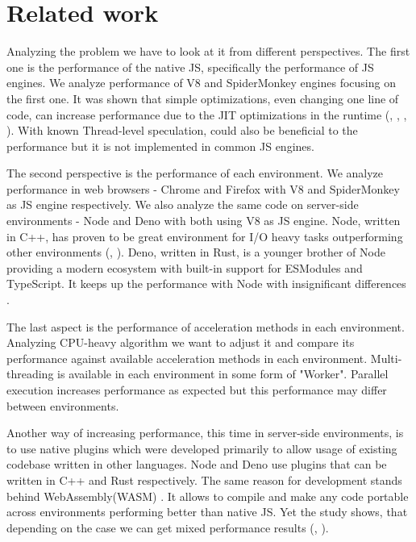 \section{Related work}
Analyzing the problem we have to look at it from different perspectives. The first one is the performance of the native JS, specifically the performance of JS engines. We analyze performance of V8 and SpiderMonkey engines focusing on the first one. It was shown that simple optimizations, even changing one line of code, can increase performance due to the JIT optimizations in the runtime (\cite{meurer_2017}, \cite{meurer_2019}, \cite{gong2015jitprof}, \cite{selakovic2016performance}). With known  Thread-level speculation, could also be beneficial to the performance \cite{martinsen2017combining} but it is not implemented in common JS engines.

The second perspective is the performance of each environment. We analyze performance in web browsers - Chrome and Firefox with V8 and SpiderMonkey \cite{spidermonkey} as JS engine respectively. We also analyze the same code on server-side environments - Node and Deno \cite{Deno} with both using V8 as JS engine. Node, written in C++, has proven to be great environment for I/O heavy tasks outperforming other environments (\cite{lei2014performance}, \cite{chitra2017performance}). Deno, written in Rust, is a younger brother of Node providing a modern ecosystem with built-in support for ESModules and TypeScript. It keeps up the performance with Node with insignificant differences \cite{choubey_2021}.

The last aspect is the performance of acceleration methods in each environment. Analyzing CPU-heavy algorithm we want to adjust it and compare its performance against available acceleration methods in each environment. Multi-threading is available in each environment in some form of "Worker". Parallel execution increases performance as expected \cite{djarv2020performance} but this performance may differ between environments. 

Another way of increasing performance, this time in server-side environments, is to use native plugins which were developed primarily to allow usage of existing codebase written in other languages. Node and Deno use plugins that can be written in C++ \cite{cpp_addons} and Rust \cite{logrocket_blog_2021} respectively. The same reason for development stands behind WebAssembly(WASM) \cite{niessen2020webassembly}. It allows to compile and make any code portable across environments performing better than native JS. Yet the study shows, that depending on the case we can get mixed performance results (\cite{yan2021understanding}, \cite{jangda2019not}). 

